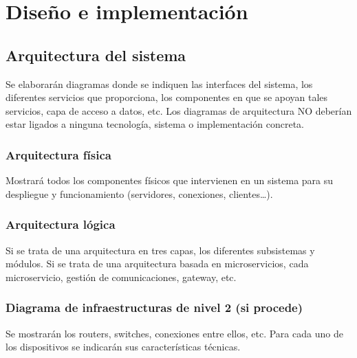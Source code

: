 \vspace*{-1cm}


\section{Diseño e implementación} %
\label{sec:diseño-implementación}


\subsection{Arquitectura del sistema}
Se elaborarán diagramas donde se indiquen las interfaces del sistema, los diferentes servicios que proporciona, los componentes en que se apoyan tales servicios, capa de acceso a datos, etc. Los diagramas de arquitectura NO deberían estar ligados a ninguna tecnología, sistema o implementación concreta.

\subsubsection{Arquitectura física}
Mostrará todos los componentes físicos que intervienen en un sistema para su despliegue y funcionamiento (servidores, conexiones, clientes…).

\subsubsection{Arquitectura lógica}
Si se trata de una arquitectura en tres capas, los diferentes subsistemas y módulos. Si se trata de una arquitectura basada en microservicios, cada microservicio, gestión de comunicaciones, gateway, etc.

\subsubsection{Diagrama de infraestructuras de nivel 2 (si procede)}
Se mostrarán los routers, switches, conexiones entre ellos, etc. Para cada uno de los dispositivos se indicarán sus características técnicas.

